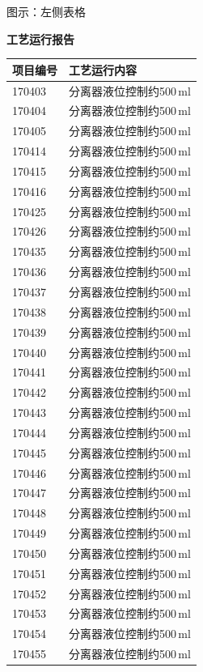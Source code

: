 \documentclass[UTF8,10pt,a4paper,fontset=fandol]{ctexart}
\begin{document}
\begin{center}
\begin{minipage}[t]{0.47\textwidth}
\medskip
\scriptsize
图示：左侧表格
\end{minipage}
\hfill
\begin{minipage}[t]{0.47\textwidth}
\centering
\textbf{工艺运行报告}

\smallskip
\begin{tabularx}{\textwidth}{|p{}|X|}
\hline
\textbf{项目编号} & \textbf{工艺运行内容} \\ \hline
170403 & 分离器液位控制约500\,ml \\ \hline
170404 & 分离器液位控制约500\,ml \\ \hline
170405 & 分离器液位控制约500\,ml \\ \hline
170414 & 分离器液位控制约500\,ml \\ \hline
170415 & 分离器液位控制约500\,ml \\ \hline
170416 & 分离器液位控制约500\,ml \\ \hline
170425 & 分离器液位控制约500\,ml \\ \hline
170426 & 分离器液位控制约500\,ml \\ \hline
170435 & 分离器液位控制约500\,ml \\ \hline
170436 & 分离器液位控制约500\,ml \\ \hline
170437 & 分离器液位控制约500\,ml \\ \hline
170438 & 分离器液位控制约500\,ml \\ \hline
170439 & 分离器液位控制约500\,ml \\ \hline
170440 & 分离器液位控制约500\,ml \\ \hline
170441 & 分离器液位控制约500\,ml \\ \hline
170442 & 分离器液位控制约500\,ml \\ \hline
170443 & 分离器液位控制约500\,ml \\ \hline
170444 & 分离器液位控制约500\,ml \\ \hline
170445 & 分离器液位控制约500\,ml \\ \hline
170446 & 分离器液位控制约500\,ml \\ \hline
170447 & 分离器液位控制约500\,ml \\ \hline
170448 & 分离器液位控制约500\,ml \\ \hline
170449 & 分离器液位控制约500\,ml \\ \hline
170450 & 分离器液位控制约500\,ml \\ \hline
170451 & 分离器液位控制约500\,ml \\ \hline
170452 & 分离器液位控制约500\,ml \\ \hline
170453 & 分离器液位控制约500\,ml \\ \hline
170454 & 分离器液位控制约500\,ml \\ \hline
170455 & 分离器液位控制约500\,ml \\ \hline
\end{tabularx}


\end{minipage}
\end{center}
\end{document}
